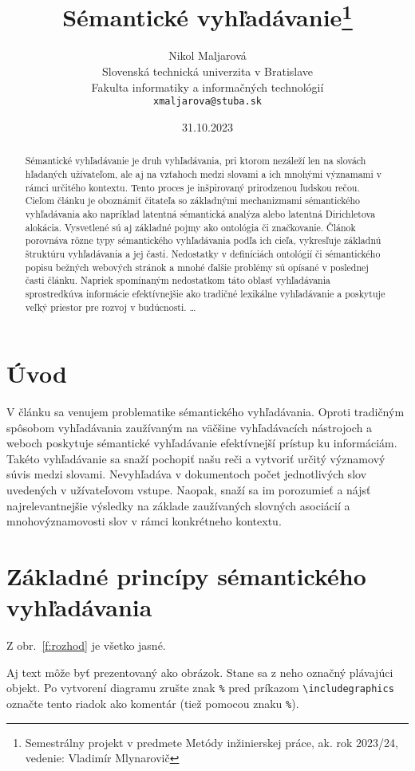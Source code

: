 \documentclass[10pt,twoside,slovak,a4paper]{article}
\title{Sémantické vyhľadávanie\thanks{Semestrálny projekt v predmete Metódy inžinierskej práce, ak. rok 2023/24, vedenie: Vladimír Mlynarovič}} %
\author{Nikol Maljarová\\[2pt]
	{\small Slovenská technická univerzita v Bratislave}\\
	{\small Fakulta informatiky a informačných technológií}\\
	{\small \texttt{xmaljarova@stuba.sk}}
	}
\date{\small 31.10.2023} %
\begin{document}
\maketitle

\begin{abstract}
Sémantické vyhľadávanie je druh vyhľadávania, pri ktorom nezáleží len na slovách hľadaných užívateľom, ale aj na vzťahoch medzi slovami a ich mnohými významami v rámci určitého kontextu. Tento proces je inšpirovaný prirodzenou ľudskou rečou. Cieľom článku je oboznámiť čitateľa so základnými mechanizmami sémantického vyhľadávania ako napríklad latentná sémantická analýza alebo latentná Dirichletova alokácia. Vysvetlené sú aj základné pojmy ako ontológia či značkovanie. Článok porovnáva rôzne typy sémantického vyhľadávania podľa ich cieľa, vykresľuje základnú štruktúru vyhľadávania a jej časti. Nedostatky v definíciách ontológií či sémantického popisu bežných webových stránok a mnohé ďalšie problémy sú opísané v poslednej časti článku. Napriek spomínaným nedostatkom táto oblasť vyhľadávania sprostredkúva informácie efektívnejšie ako tradičné lexikálne vyhľadávanie a poskytuje veľký priestor pre rozvoj v budúcnosti. 
\ldots
\end{abstract}



\section{Úvod}
V článku sa venujem problematike sémantického vyhľadávania. Oproti tradičným spôsobom vyhľadávania zaužívaným na väčšine vyhľadávacích nástrojoch a weboch poskytuje sémantické vyhľadávanie efektívnejší prístup ku informáciám.
 Takéto vyhľadávanie sa snaží pochopiť našu reči a vytvoriť určitý významový súvis medzi slovami. Nevyhľadáva v dokumentoch počet jednotlivých slov uvedených v užívateľovom vstupe. Naopak, snaží sa im porozumieť a nájsť najrelevantnejšie výsledky na základe zaužívaných slovných asociácií a mnohovýznamovosti slov v rámci konkrétneho kontextu. 



\section{Základné princípy sémantického vyhľadávania} \label{nejaka}

Z obr.~\ref{f:rozhod} je všetko jasné. 

\begin{figure*}[tbh]
\centering
Aj text môže byť prezentovaný ako obrázok. Stane sa z neho označný plávajúci objekt. Po vytvorení diagramu zrušte znak \texttt{\%} pred príkazom \verb|\includegraphics| označte tento riadok ako komentár (tiež pomocou znaku \texttt{\%}).
\caption{Rozhodujúci argument.}
\label{f:rozhod}
\end{figure*}
\end{document}
